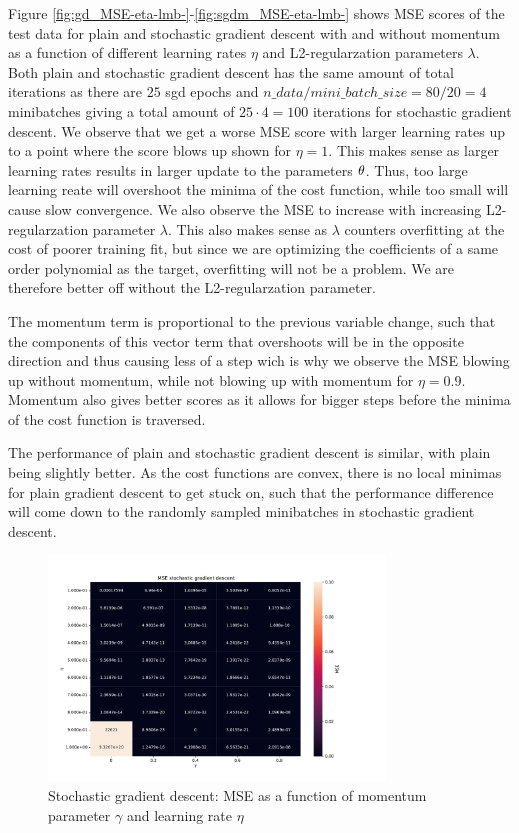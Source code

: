 Figure \ref{fig:gd_MSE-eta-lmb-}-\ref{fig:sgdm_MSE-eta-lmb-} shows MSE scores of the test data for 
plain and stochastic gradient descent with and without momentum as a function of
different learning rates \(\eta \) and L2-regularzation parameters \(\lambda \). Both plain and 
stochastic gradient descent has the same amount of total iterations as there are $25$ sgd epochs 
and $n\_data/mini\_batch\_size=80/20=4$ minibatches giving a total amount of $25 \cdot 4 = 100$ 
iterations for stochastic gradient descent. We observe that we get a worse MSE score with larger 
learning rates up to a point where the score blows up shown for $\eta=1$. This makes sense as larger 
learning rates results in larger update to the parameters $\bf{\theta } $. Thus, too large learning reate 
will overshoot the minima of the cost function, while too small will cause slow convergence.  
We also observe the MSE to increase with increasing L2-regularzation parameter $\lambda $. This also 
makes sense as $\lambda $ counters overfitting at the cost of poorer training fit, but since we are 
optimizing the coefficients of a same order polynomial as the target, overfitting will not be a problem.
We are therefore better off without the L2-regularzation parameter. 

The momentum 
term is proportional to the previous variable change, such that the components of this vector term that overshoots will  
be in the opposite direction and thus causing less of a step wich is why we observe the MSE blowing up without momentum,
while not blowing up with momentum for $\eta =0.9$. Momentum also gives better scores as it allows for bigger steps
before the minima of the cost function is traversed. 

The performance of plain and stochastic gradient descent is similar, with plain being slightly better. As the 
cost functions are convex, there is no local minimas for plain gradient descent to get stuck on, such that the 
performance difference will come down to the randomly sampled minibatches in stochastic gradient descent. 



\begin{figure}[H]
\centering
\includegraphics[width=0.8\textwidth]{Figures/PartA/_sgdm_MSE(eta,momentum)}
\caption{Stochastic gradient descent: MSE as a function of momentum parameter
    $\gamma$  and learning rate \(\eta \)	 }
\label{fig:_sgdm_MSE-eta-momentum-}
\end{figure}

